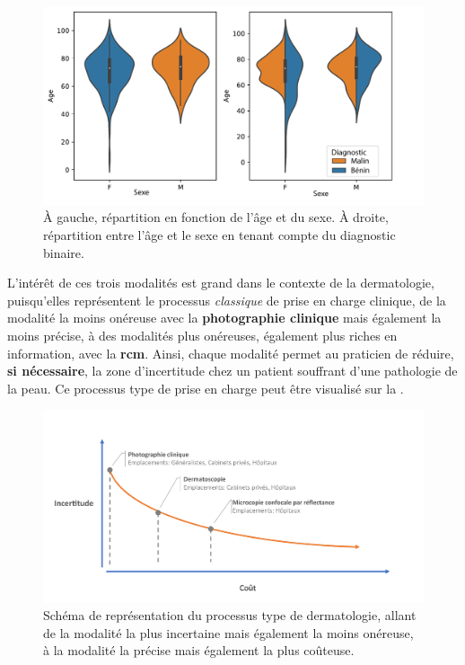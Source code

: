 \begin{figure}[H]
    \centering
    \includegraphics[width=\linewidth]{contents/chapter_4/resources/statistics_age_sex.pdf}
    \caption{À gauche, répartition en fonction de l'âge et du sexe. À droite, répartition entre l'âge et le sexe en tenant compte du diagnostic binaire.}
    \label{fig:statistics_age_sex}
\end{figure}\par

L'intérêt de ces trois modalités est grand dans le contexte de la dermatologie, puisqu'elles représentent le processus \textit{classique} de prise en charge clinique, de la modalité la moins onéreuse avec la \textbf{photographie clinique} mais également la moins précise, à des modalités plus onéreuses, également plus riches en information, avec la \textbf{\gls{rcm}}. Ainsi, chaque modalité permet au praticien de réduire, \textbf{si nécessaire}, la zone d'incertitude chez un patient souffrant d'une pathologie de la peau. Ce processus type de prise en charge peut être visualisé sur la .\par

\begin{figure}[H]
    \centering
    \includegraphics[width=\linewidth]{contents/chapter_4/resources/scheme_devices_location.pdf}
    \caption{Schéma de représentation du processus type de dermatologie, allant de la modalité la plus incertaine mais également la moins onéreuse, à la modalité la précise mais également la plus coûteuse.}
    \label{fig:scheme_devices_location}
\end{figure}\par

